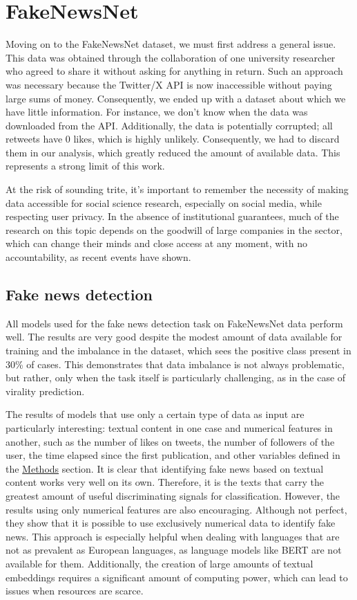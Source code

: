 \documentclass[a4paper,twoside,12pt]{book}
\begin{document}
\section{FakeNewsNet}
Moving on to the FakeNewsNet dataset, we must first address a general issue. This data was obtained through the collaboration of one university researcher who agreed to share it without asking for anything in return. Such an approach was necessary because the Twitter/X API is now inaccessible without paying large sums of money.
Consequently, we ended up with a dataset about which we have little information. For instance, we don't know when the data was downloaded from the API. Additionally, the data is potentially corrupted; all retweets have 0 likes, which is highly unlikely. Consequently, we had to discard them in our analysis, which greatly reduced the amount of available data. This represents a strong limit of this work.

At the risk of sounding trite, it's important to remember the necessity of making data accessible for social science research, especially on social media, while respecting user privacy. In the absence of institutional guarantees, much of the research on this topic depends on the goodwill of large companies in the sector, which can change their minds and close access at any moment, with no accountability, as recent events have shown.

\subsection{Fake news detection}

All models used for the fake news detection task on FakeNewsNet data perform well. The results are very good despite the modest amount of data available for training and the imbalance in the dataset, which sees the positive class present in 30\% of cases. This demonstrates that data imbalance is not always problematic, but rather, only when the task itself is particularly challenging, as in the case of virality prediction.

The results of models that use only a certain type of data as input are particularly interesting: textual content in one case and numerical features in another, such as the number of likes on tweets, the number of followers of the user, the time elapsed since the first publication, and other variables defined in the \hyperref[Methods]{Methods} section. It is clear that identifying fake news based on textual content works very well on its own. Therefore, it is the texts that carry the greatest amount of useful discriminating signals for classification. However, the results using only numerical features are also encouraging. Although not perfect, they show that it is possible to use exclusively numerical data to identify fake news. This approach is especially helpful when dealing with languages that are not as prevalent as European languages, as language models like BERT are not available for them. Additionally, the creation of large amounts of textual embeddings requires a significant amount of computing power, which can lead to issues when resources are scarce.
\end{document}
